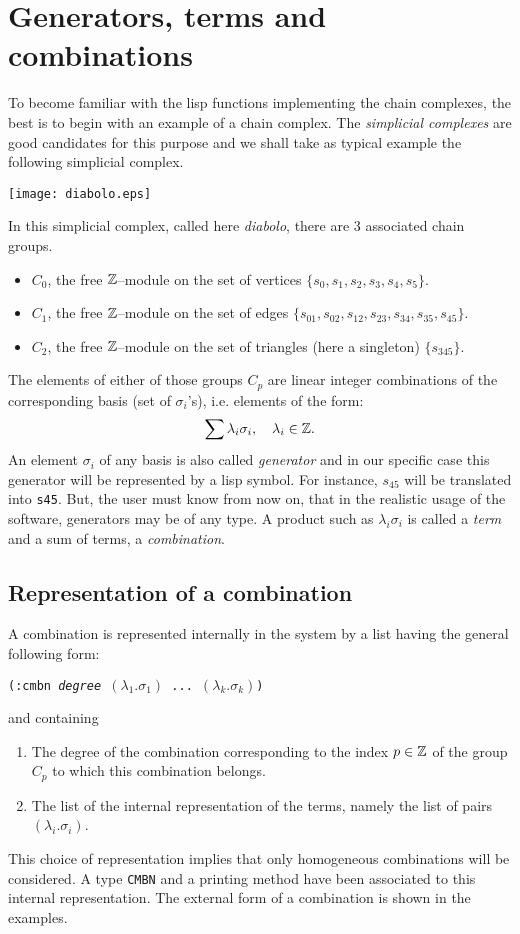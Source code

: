 \section {Generators, terms and combinations}

To become familiar with the lisp functions implementing the chain complexes, the best is to begin
with an example of a chain complex. The {\em simplicial complexes} are good candidates
for this purpose and we shall take as typical example the following simplicial
complex.
%
\vskip 0.50cm
\centerline{\texttt{[image: diabolo.eps]}}
\vskip 0.50cm
%
In this simplicial complex, called here {\em diabolo}, there are $3$ associated chain groups.
\begin{itemize}
\item $C_0$, the free ${\mathbb{Z}}$--module on the set of vertices $\{s_0,s_1,s_2,s_3,s_4,s_5 \}$.
\item $C_1$, the free ${\mathbb{Z}}$--module on the set of  edges
   $\{ s_{01}, s_{02}, s_{12}, s_{23}, s_{34}, s_{35}, s_{45} \}$.
\item $C_2$, the free ${\mathbb{Z}}$--module on the set of  triangles (here a singleton)
   $\{ s_{345} \}$.
\end{itemize}
The elements of either of those groups $C_p$ are linear integer combinations  of the
corresponding basis (set of $\sigma_i$'s), i.e. elements of the form:
$$ \sum {\lambda_i \sigma_i}, \quad \lambda_i \in {\mathbb{Z}}. $$
An element $\sigma_i$ of any basis is also called {\em generator} and in our specific case
this generator will be represented by a lisp symbol. For instance,
$s_{45}$ will be translated into {\tt s45}. But, the user must know from now on, that in the realistic
usage of the software, generators may be of any type.
A product such as $\lambda_i \sigma_i$ is called
a {\em term} and a sum of terms, a {\em combination}.

\subsection {Representation of a combination}

A combination is represented internally in the system by a  list
having the general following form:
\begin{center}
{\tt (:cmbn {\em degree} $(\lambda_1.\sigma_1)$ ... $(\lambda_k.\sigma_k)$)}
\end{center}
and containing
\begin{enumerate}
\item The degree of the combination  corresponding to the index $p \in {\mathbb{Z}}$  of the group
$C_p$ to which this combination belongs.
\item The  list of the internal representation of the terms, namely the list of pairs $(\lambda_i.\sigma_i)$.
\end{enumerate}
This choice of representation implies that only homogeneous combinations
will be considered. A type {\tt CMBN} and
a printing method have been associated to this internal representation. The external
form of a combination is shown in the  examples.

